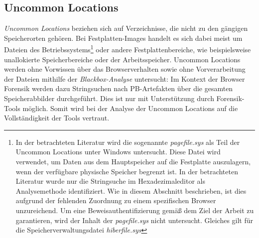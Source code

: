 \subsection{Uncommon Locations}
\label{subsection:methodik-datenanalyse-uncommonlocations}
\textit{Uncommon Locations} beziehen sich auf Verzeichnisse, die nicht zu den gängigen Speicherorten gehören. 
Bei Festplatten-Images handelt es sich dabei meist um Dateien des Betriebssystems\footnote{
In der betrachteten Literatur wird die sogenannte \textit{pagefile.sys} als Teil der Uncommon Locations unter Windows untersucht. Diese Datei wird verwendet, um Daten aus dem Hauptspeicher auf die Festplatte auszulagern, wenn der verfügbare physische Speicher begrenzt ist. \cite{MicrosoftLearn.21.03.2023}
In der betrachteten Literatur wurde nur die Stringsuche im Hexadezimaleditor als Analysemethode identifiziert. Wie in diesem Abschnitt beschrieben, ist dies aufgrund der fehlenden Zuordnung zu einem spezifischen Browser unzureichend. Um eine Beweisauthentifizierung gemäß dem Ziel der Arbeit zu garantieren, wird der Inhalt der \textit{pagefile.sys} nicht untersucht. Gleiches gilt für die Speicherverwaltungsdatei \textit{hiberfile.sys}
} oder andere Festplattenbereiche, wie beispielsweise unallokierte Speicherbereiche oder der Arbeitsspeicher.
Uncommon Locations werden ohne Vorwissen über das Browserverhalten sowie ohne Vorverarbeitung der Dateien mithilfe der \textit{Blackbox-Analyse} untersucht:
Im Kontext der Browser Forensik werden dazu Stringsuchen nach PB-Artefakten über die gesamten Speicherabbilder durchgeführt.
Dies ist nur mit Unterstützung durch Forensik-Tools möglich. \cite{Bonetti.2014} Somit wird bei der Analyse der Uncommon Locations auf die Vollständigkeit der Tools vertraut.

